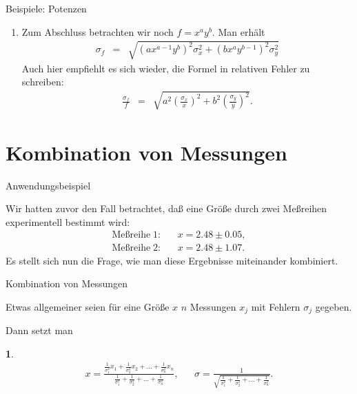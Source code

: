 \documentclass[german]{beamer}
\newcommand{\bq}{\begin{eqnarray*}}
\newcommand{\eq}{\end{eqnarray*}}
\newtheorem*{myemptytheorem}{}
\begin{document}
\begin{frame}{Beispiele: Potenzen}

\begin{enumerate}[5]

\item Zum Abschluss betrachten wir noch $f = x^a y^b$. Man erh\"alt
\bq
 \sigma_f & = & \sqrt{ \left( a x^{a-1} y^b \right)^2 \sigma_x^2 
                     + \left( b x^a y^{b-1} \right)^2 \sigma_y^2}
\eq
Auch hier empfiehlt es sich wieder, die Formel in relativen Fehler zu schreiben:
\bq
 \frac{\sigma_f}{f} & = & \sqrt{ a^2 \left(\frac{\sigma_x}{x}\right)^2 + b^2 \left(\frac{\sigma_y}{y}\right)^2 }.
\eq

\end{enumerate}

\end{frame}


\section{Kombination von Messungen}

\frame{\sectionpage}

\begin{frame}{Anwendungsbeispiel}

Wir hatten zuvor den Fall betrachtet, da{\ss} eine Gr\"o{\ss}e durch zwei Me{\ss}reihen 
experimentell bestimmt wird: 
\bq
 \mbox{Me{\ss}reihe}\; 1: & & x = 2.48 \pm 0.05,
 \nonumber \\
 \mbox{Me{\ss}reihe}\; 2: & & x = 2.48 \pm 1.07.
\eq
Es stellt sich nun die Frage, wie man diese Ergebnisse miteinander kombiniert.

\end{frame}

\begin{frame}{Kombination von Messungen}

Etwas allgemeiner seien f\"ur eine Gr\"o{\ss}e $x$ $n$ Messungen $x_j$ mit Fehlern $\sigma_j$ gegeben.

\vspace*{3mm}
Dann setzt man
\begin{myemptytheorem}
\bq
 x = \frac{\frac{1}{\sigma_1^2} x_1 + \frac{1}{\sigma_2^2} x_2 + ... + \frac{1}{\sigma_n^2} x_n}
              {\frac{1}{\sigma_1^2} + \frac{1}{\sigma_2^2} + ... + \frac{1}{\sigma_n^2} },
 & &
 \sigma = \frac{1}{\sqrt{\frac{1}{\sigma_1^2} + \frac{1}{\sigma_2^2} + ... + \frac{1}{\sigma_n^2}}}.
\eq
\end{myemptytheorem}

\end{frame}
\end{document}
